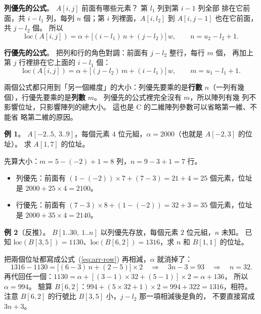 \textbf{列優先的公式}。 $A[i, j]$ 前面有哪些元素？ 第 $l_1$ 列到第 $i - 1$ 列全部
排在它前面，共 $i - l_1$ 列，每列 $n$ 個；第 $i$ 列裡面，$A[i, l_2]$ 到
$A[i, j - 1]$ 也在它前面，共 $j - l_2$ 個。 所以
\begin{equation}
\mathrm{loc}(A[i, j]) = \alpha + \bigl[(i - l_1)\,n + (j - l_2)\bigr]\,w ,
\qquad n = u_2 - l_2 + 1 .
\label{eq:arr-row}
\end{equation}

\textbf{行優先的公式}。 把列和行的角色對調：前面有 $j - l_2$ 整行，每行 $m$ 個，
再加上第 $j$ 行裡排在它上面的 $i - l_1$ 個：
\begin{equation}
\mathrm{loc}(A[i, j]) = \alpha + \bigl[(j - l_2)\,m + (i - l_1)\bigr]\,w ,
\qquad m = u_1 - l_1 + 1 .
\label{eq:arr-col}
\end{equation}

兩個公式都只用到「另一個維度」的大小：列優先要乘的是\textbf{行數} $n$（一列有幾
個），行優先要乘的是\textbf{列數} $m$。 列優先的公式裡完全沒有 $m$，所以陣列有幾
列不影響位址，只影響陣列的總大小。 這也是 C 的二維陣列參數可以省略第一維、不能省
略第二維的原因。

\textbf{例 1}。 $A[-2..5,\ 3..9]$，每個元素 $4$ 位元組，$\alpha = 2000$（也就是
$A[-2, 3]$ 的位址）。 求 $A[1, 7]$ 的位址。

先算大小：$m = 5 - (-2) + 1 = 8$ 列，$n = 9 - 3 + 1 = 7$ 行。

\begin{itemize}
\item 列優先：前面有 $(1 - (-2)) \times 7 + (7 - 3) = 21 + 4 = 25$ 個元素，位址是
$2000 + 25 \times 4 = 2100$。
\item 行優先：前面有 $(7 - 3) \times 8 + (1 - (-2)) = 32 + 3 = 35$ 個元素，位址是
$2000 + 35 \times 4 = 2140$。
\end{itemize}

\textbf{例 2}（反推）。 $B[1..30,\ 1..n]$ 以列優先存放，每個元素 $2$ 位元組，$n$
未知。 已知 $\mathrm{loc}(B[3, 5]) = 1130$、$\mathrm{loc}(B[6, 2]) = 1316$，求 $n$ 和
$B[1, 1]$ 的位址。

把兩個位址都寫成公式~(\ref{eq:arr-row}) 再相減，$\alpha$ 就消掉了：
\[
1316 - 1130 = \bigl[(6 - 3)\,n + (2 - 5)\bigr] \times 2
\quad\Longrightarrow\quad 3n - 3 = 93
\quad\Longrightarrow\quad n = 32 .
\]
再代回任一個：$1130 = \alpha + [(3 - 1) \times 32 + (5 - 1)] \times 2 = \alpha + 136$，
所以 $\alpha = 994$。 驗算 $B[6, 2]$：$994 + (5 \times 32 + 1) \times 2 = 994 + 322
= 1316$，相符。 注意 $B[6, 2]$ 的行號比 $B[3, 5]$ 小，$j - l_2$ 那一項相減後是負的，
不要直接寫成 $3n + 3$。

